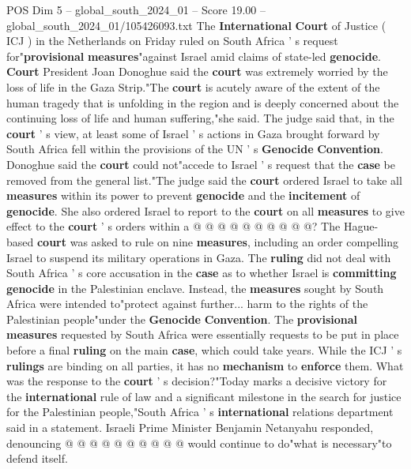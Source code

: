 \begin{textsample}{POS Dim 5 – global\_south\_2024\_01 – Score 19.00 – global\_south\_2024\_01/105426093.txt}  \label{ex:f5_pos_012}
The \textbf{International} \textbf{Court} of Justice ( ICJ ) in the Netherlands on Friday ruled on South Africa ' s request for"\textbf{provisional} \textbf{measures}"against Israel amid claims of state-led \textbf{genocide}. \textbf{Court} President Joan Donoghue said the \textbf{court} was extremely worried by the loss of life in the Gaza Strip."The \textbf{court} is acutely aware of the extent of the human tragedy that is unfolding in the region and is deeply concerned about the continuing loss of life and human suffering,"she said.
The judge said that, in the \textbf{court} ' s view, at least some of Israel ' s actions in Gaza brought forward by South Africa fell within the provisions of the UN ' s \textbf{Genocide} \textbf{Convention}.
Donoghue said the \textbf{court} could not"accede to Israel ' s request that the \textbf{case} be removed from the general list."The judge said the \textbf{court} ordered Israel to take all \textbf{measures} within its power to prevent \textbf{genocide} and the \textbf{incitement} of \textbf{genocide}.
She also ordered Israel to report to the \textbf{court} on all \textbf{measures} to give effect to the \textbf{court} ' s orders within a @ @ @ @ @ @ @ @ @ @?
The Hague-based \textbf{court} was asked to rule on nine \textbf{measures}, including an order compelling Israel to suspend its military operations in Gaza.
The \textbf{ruling} did not deal with South Africa ' s core accusation in the \textbf{case} as to whether Israel is \textbf{committing} \textbf{genocide} in the Palestinian enclave.
Instead, the \textbf{measures} sought by South Africa were intended to"protect against further... harm to the rights of the Palestinian people"under the \textbf{Genocide} \textbf{Convention}.
The \textbf{provisional} \textbf{measures} requested by South Africa were essentially requests to be put in place before a final \textbf{ruling} on the main \textbf{case}, which could take years.
While the ICJ ' s \textbf{rulings} are binding on all parties, it has no \textbf{mechanism} to \textbf{enforce} them.
What was the response to the \textbf{court} ' s decision?"Today marks a decisive victory for the \textbf{international} rule of law and a significant milestone in the search for justice for the Palestinian people,"South Africa ' s \textbf{international} relations department said in a statement.
Israeli Prime Minister Benjamin Netanyahu responded, denouncing @ @ @ @ @ @ @ @ @ @ would continue to do"what is necessary"to defend itself.

\end{textsample}
